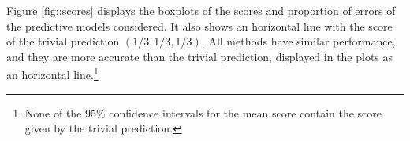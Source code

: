 \documentclass[journal,article,accept,moreauthors,pdftex,12pt,a4paper]{mdpi}
\begin{document}





%


Figure \ref{fig::scores} displays the boxplots of the scores and proportion of errors of the predictive models considered.
It also shows an horizontal line with the score of the trivial prediction $(1/3,1/3,1/3)$. 
All methods have similar performance, and they are more accurate than the trivial prediction, displayed in the plots
as an horizontal line.\footnote{None of the 95\% confidence intervals for the mean score contain the score given by the trivial prediction.}
\end{document}
